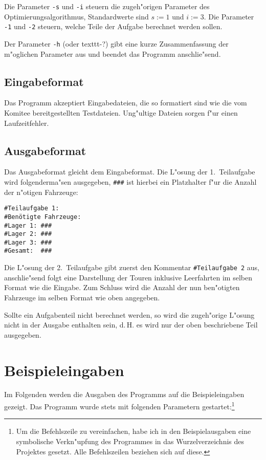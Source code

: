 \documentclass{scrreprt}
\begin{document}
Die Parameter \texttt{-s} und \texttt{-i} steuern die zugeh"origen Parameter des
Optimierungsalgorithmus, Standardwerte sind $s := 1$ und $i := 3$. Die Parameter
\texttt{-1} und \texttt{-2} steuern, welche Teile der Aufgabe berechnet werden
sollen.

Der Parameter \texttt{-h} (oder {texttt{-?}}) gibt eine kurze Zusammenfassung
der m"oglichen Parameter aus und beendet das Programm anschlie"send.

\section{Eingabeformat}
Das Programm akzeptiert Eingabedateien, die so formatiert sind wie die vom
Komitee bereitgestellten Testdateien.  Ung"ultige Dateien sorgen f"ur einen
Laufzeitfehler.

\section{Ausgabeformat}
Das Ausgabeformat gleicht dem Eingabeformat.  Die L"osung der 1.\ Teilaufgabe
wird folgenderma"sen ausgegeben, \texttt{\#\#\#} ist hierbei ein Platzhalter
f"ur die Anzahl der n"otigen Fahrzeuge:

\begin{verbatim}
#Teilaufgabe 1:
#Benötigte Fahrzeuge:
#Lager 1: ###
#Lager 2: ###
#Lager 3: ###
#Gesamt:  ###
\end{verbatim}

Die L"osung der 2.\ Teilaufgabe gibt zuerst den Kommentar \texttt{\#Teilaufgabe\ 
2} aus, anschlie"send folgt eine Darstellung der Touren inklusive Leerfahrten
im selben Format wie die Eingabe.  Zum Schluss wird die Anzahl der nun
ben"otigten Fahrzeuge im selben Format wie oben angegeben.

Sollte ein Aufgabenteil nicht berechnet werden, so wird die zugeh"orige L"osung
nicht in der Ausgabe enthalten sein, d.\,H. es wird nur der oben beschriebene
Teil ausgegeben.

\chapter{Beispieleingaben}
Im Folgenden werden die Ausgaben des Programms auf die Beispieleingaben gezeigt.
Das Programm wurde stets mit folgenden Parametern gestartet:\footnote{Um die
Befehlszeile zu vereinfachen, habe ich in den Beispielausgaben eine symbolische
Verkn"upfung des Programmes in das Wurzelverzeichnis des Projektes gesetzt. Alle
Befehlszeilen beziehen sich auf diese.}
\end{document}
